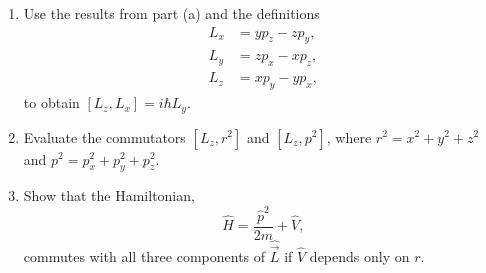 \documentclass[a4paper, 12pt]{config/homework}
\begin{document}
\begin{enumerate}
\begin{enumerate}[label=(\alph*)]
\item Use the results from part (a) and the definitions
\begin{align*}
L_x&=yp_z-zp_y, \\
L_y&=zp_x-xp_z, \\
L_z&=xp_y-yp_x,
\end{align*}
to obtain \([L_z,L_x]=i\hbar L_y\). \bigskip


\item Evaluate the commutators \([L_z, r^2]\) and \([L_z, p^2]\), where \(r^2 = x^2 + y^2 + z^2\) and \(p^2 = p^2_x + p^2_y + p^2_z\). \bigskip



\item Show that the Hamiltonian, \[\hat{H}=\frac{\hat{p}^2}{2m} + \hat{V},\] commutes with all three components of \(\hat{\vec{L}}\) if \(\hat{V}\) depends only on \(r\). \bigskip



\end{enumerate}
\end{enumerate}
\end{document}
